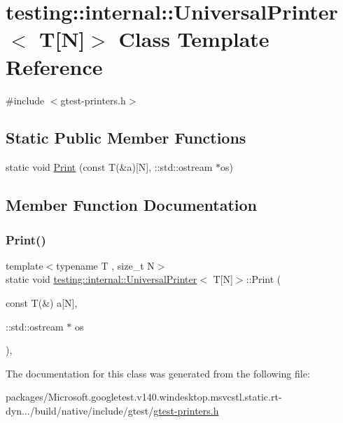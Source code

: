 \hypertarget{classtesting_1_1internal_1_1_universal_printer_3_01_t[_n]_4}{}\section{testing\+::internal\+::Universal\+Printer$<$ T\mbox{[}N\mbox{]}$>$ Class Template Reference}
\label{classtesting_1_1internal_1_1_universal_printer_3_01_t[_n]_4}


{\ttfamily \#include $<$gtest-\/printers.\+h$>$}

\subsection*{Static Public Member Functions}
\begin{DoxyCompactItemize}
\item 
static void \mbox{\hyperlink{classtesting_1_1internal_1_1_universal_printer_3_01_t[_n]_4_a1cf0e7c8db59c090f769116c6421b212}{Print}} (const T(\&a)\mbox{[}N\mbox{]}, \+::std\+::ostream $\ast$os)
\end{DoxyCompactItemize}


\subsection{Member Function Documentation}
\mbox{\label{classtesting_1_1internal_1_1_universal_printer_3_01_t[_n]_4_a1cf0e7c8db59c090f769116c6421b212}} 
\subsubsection{\texorpdfstring{Print()}{Print()}}
{\footnotesize\ttfamily template$<$typename T , size\+\_\+t N$>$ \\
static void \mbox{\hyperlink{classtesting_1_1internal_1_1_universal_printer}{testing\+::internal\+::\+Universal\+Printer}}$<$ T\mbox{[}N\mbox{]}$>$\+::Print (\begin{DoxyParamCaption}\item[{const T(\&)}]{a\mbox{[}\+N\mbox{]},  }\item[{\+::std\+::ostream $\ast$}]{os }\end{DoxyParamCaption})\hspace{0.3cm}{\ttfamily [inline]}, {\ttfamily [static]}}



The documentation for this class was generated from the following file\+:\begin{DoxyCompactItemize}
\item 
packages/\+Microsoft.\+googletest.\+v140.\+windesktop.\+msvcstl.\+static.\+rt-\/dyn.../build/native/include/gtest/\mbox{\hyperlink{gtest-printers_8h}{gtest-\/printers.\+h}}\end{DoxyCompactItemize}
